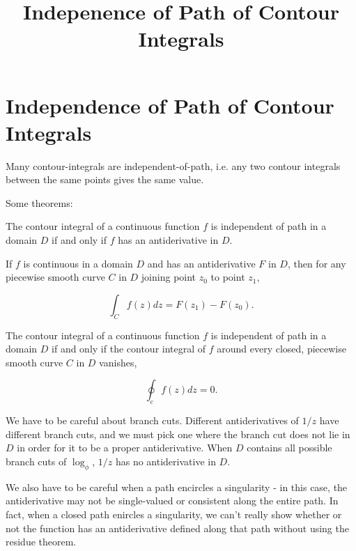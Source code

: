 \documentclass{article}
\title{Indepenence of Path of Contour Integrals}
\begin{document}
\section{Independence of Path of Contour Integrals}

Many \@{contour-integrals} are \@{independent-of-path}, i.e. any two contour integrals between the same points gives the same value.

Some theorems:

The contour integral of a \@{continuous} function $f$ is independent of path in a \@{domain} $D$ if and only if $f$ has an antiderivative in $D$.

If $f$ is continuous in a domain $D$ and has an antiderivative $F$ in $D$, then for any piecewise \@{smooth} curve $C$ in $D$ joining point $z_0$ to point $z_1$,

\[ \int_C f(z) dz = F(z_1) - F(z_0). \]

The contour integral of a continuous function $f$ is independent of path in a domain $D$ if and only if the contour integral of $f$ around every closed, piecewise smooth curve $C$ in $D$ vanishes,

\[ \oint_c f(z) dz = 0. \]

We have to be careful about branch cuts. Different antiderivatives of $1/z$ have different branch cuts, and we must pick one where the branch cut does not lie in $D$ in order for it to be a proper antiderivative. When $D$ contains all possible branch cuts of $\log_\phi$, $1/z$ has no antiderivative in $D$.

We also have to be careful when a path encircles a \@{singularity} - in this case, the antiderivative may not be single-valued or consistent along the entire path. In fact, when a closed path enircles a singularity, we can't really show whether or not the function has an antiderivative defined along that path without using the residue theorem.
\end{document}
